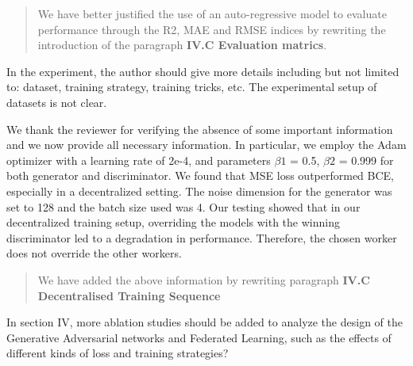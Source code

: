 \documentclass{article}
\begin{document}
\begin{quote}
We have better justified the use of an auto-regressive model to evaluate performance through the R2, MAE and RMSE indices by rewriting the introduction of the paragraph \textbf{IV.C Evaluation matrics}.
\end{quote}

\RC In the experiment, the author should give more details including but not limited to: dataset, training strategy, training tricks, etc. The experimental setup of datasets is not clear.

\AR We thank the reviewer for verifying the absence of some important information and we now provide all necessary information.
In particular, we employ the Adam optimizer with a learning rate of 2e-4, and parameters $\beta1$ = 0.5, $\beta2$ = 0.999 for both generator and discriminator.
We found that MSE loss outperformed BCE, especially in a decentralized setting. The noise dimension for the generator was set to 128 and the batch size used was 4. 
Our testing showed that in our decentralized training setup, overriding the models with the winning discriminator led to a degradation in performance. Therefore, the chosen worker does not override the other workers.


\begin{quote}
We have added the above information by rewriting paragraph \textbf{IV.C Decentralised Training Sequence}
\end{quote}

\RC In section IV, more ablation studies should be added to analyze the design of the Generative Adversarial networks and Federated Learning, such as the effects of different kinds of loss and training strategies?
\end{document}
